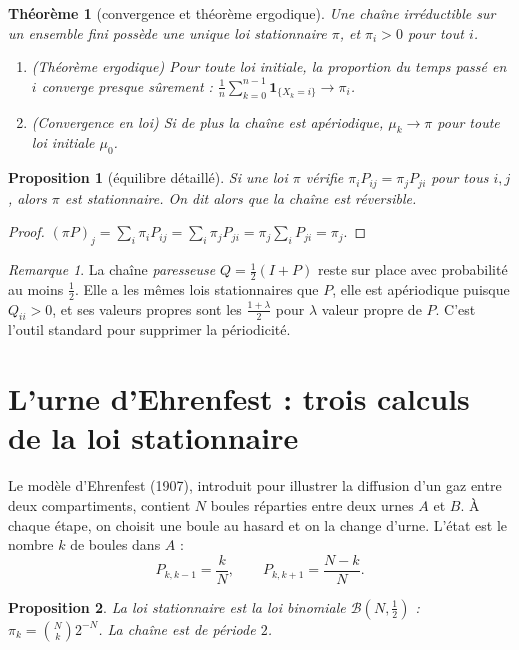\documentclass[11pt,a4paper]{article}
\newtheorem{proposition}{Proposition}
\newtheorem{theoreme}{Théorème}
\theoremstyle{remark}
\newtheorem*{remarque}{Remarque}
\newcommand{\1}{\mathbf{1}}
\begin{document}
\begin{theoreme}[convergence et théorème ergodique]\label{thm:fond}
Une chaîne irréductible sur un ensemble fini possède une unique loi stationnaire $\pi$, et $\pi_i > 0$ pour tout $i$.
\begin{enumerate}
\item \emph{(Théorème ergodique)} Pour toute loi initiale, la proportion du temps passé en $i$ converge presque sûrement : $\frac1n \sum_{k=0}^{n-1} \1_{\{X_k = i\}} \to \pi_i$.
\item \emph{(Convergence en loi)} Si de plus la chaîne est apériodique, $\mu_k \to \pi$ pour toute loi initiale $\mu_0$.
\end{enumerate}
\end{theoreme}

\begin{proposition}[équilibre détaillé]\label{prop:reversible}
Si une loi $\pi$ vérifie $\pi_i P_{ij} = \pi_j P_{ji}$ pour tous $i, j$, alors $\pi$ est stationnaire. On dit alors que la chaîne est \emph{réversible}.
\end{proposition}

\begin{proof}
$(\pi P)_j = \sum_i \pi_i P_{ij} = \sum_i \pi_j P_{ji} = \pi_j \sum_i P_{ji} = \pi_j$.
\end{proof}

\begin{remarque}
La chaîne \emph{paresseuse} $Q = \frac12 (I + P)$ reste sur place avec probabilité au moins $\frac12$. Elle a les mêmes lois stationnaires que $P$, elle est apériodique puisque $Q_{ii} > 0$, et ses valeurs propres sont les $\frac{1+\lambda}{2}$ pour $\lambda$ valeur propre de $P$. C'est l'outil standard pour supprimer la périodicité.
\end{remarque}

\section{L'urne d'Ehrenfest : trois calculs de la loi stationnaire}

Le modèle d'Ehrenfest (1907), introduit pour illustrer la diffusion d'un gaz entre deux compartiments, contient $N$ boules réparties entre deux urnes $A$ et $B$. À chaque étape, on choisit une boule au hasard et on la change d'urne. L'état est le nombre $k$ de boules dans $A$ :
\[
  P_{k,k-1} = \frac kN, \qquad P_{k,k+1} = \frac{N-k}{N}.
\]

\begin{proposition}
La loi stationnaire est la loi binomiale $\mathcal B(N, \frac12)$ : $\pi_k = \binom Nk 2^{-N}$. La chaîne est de période $2$.
\end{proposition}
\end{document}
